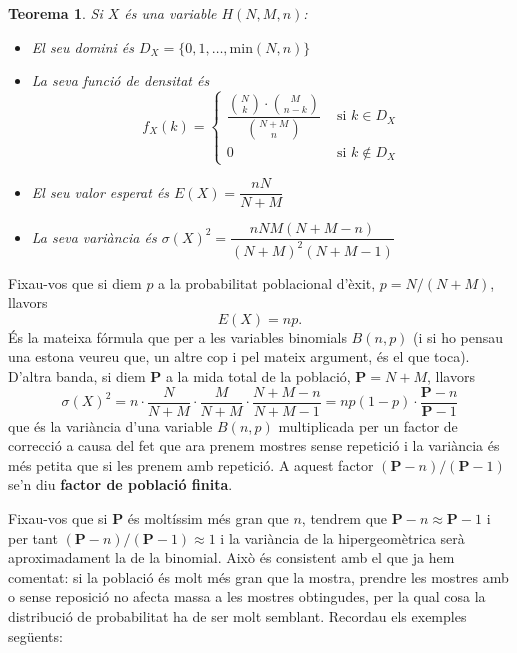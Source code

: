 \documentclass[
]{book}
\newtheorem{theorem}{Teorema}[chapter]
\theoremstyle{definition}
\theoremstyle{definition}
\theoremstyle{definition}
\theoremstyle{remark}
\begin{document}
\begin{theorem}
\protect\hypertarget{thm:unnamed-chunk-48}{}{\label{thm:unnamed-chunk-48} }Si \(X\) és una variable \(H(N,M,n)\):

\begin{itemize}
\item
  El seu domini és \(D_X=\{0,1,\ldots,\text{min}(N,n)\}\)
\item
  La seva funció de densitat és
  \[
  f_X(k)=\left\{\begin{array}{ll}
  \displaystyle\dfrac{\binom{N}{k}\cdot \binom{M}{n-k}}{\binom{N+M}{n}} & \text{ si $k\in D_X$}\\
  0 & \text{ si $k\notin D_X$}
  \end{array}
  \right.
  \]
\item
  El seu valor esperat és \(E(X)=\dfrac{nN}{N+M}\)
\item
  La seva variància és \(\sigma(X)^2=\dfrac{nNM(N+M-n)}{(N+M)^2(N+M-1)}\)
\end{itemize}
\end{theorem}

Fixau-vos que si diem \(p\) a la probabilitat poblacional d'èxit, \(p=N/(N+M)\), llavors
\[
E(X)=np.
\]
És la mateixa fórmula que per a les variables binomials \(B(n,p)\) (i si ho pensau una estona veureu que, un altre cop i pel mateix argument, és el que toca). D'altra banda, si diem \(\mathbf{P}\) a la mida total de la població, \(\mathbf{P}=N+M\), llavors
\[
\sigma(X)^2=n\cdot\dfrac{N}{N+M}\cdot\dfrac{M}{N+M}\cdot\frac{N+M-n}{N+M-1}=np(1-p)\cdot\dfrac{\mathbf{P}-n}{\mathbf{P}-1}
\]
que és la variància d'una variable \(B(n,p)\) multiplicada per un factor de correcció a causa del fet que ara prenem mostres sense repetició i la variància és més petita que si les prenem amb repetició. A aquest factor \((\mathbf{P}-n)/(\mathbf{P}-1)\) se'n diu \textbf{factor de població finita}.

Fixau-vos que si \(\mathbf{P}\) és moltíssim més gran que \(n\), tendrem que \(\mathbf{P}-n\approx \mathbf{P}-1\) i per tant \((\mathbf{P}-n)/(\mathbf{P}-1)\approx 1\) i la variància de la hipergeomètrica serà aproximadament la de la binomial. Això és consistent amb el que ja hem comentat: si la població és molt més gran que la mostra, prendre les mostres amb o sense reposició no afecta massa a les mostres obtingudes, per la qual cosa la distribució de probabilitat ha de ser molt semblant.
Recordau els exemples següents:
\end{document}
